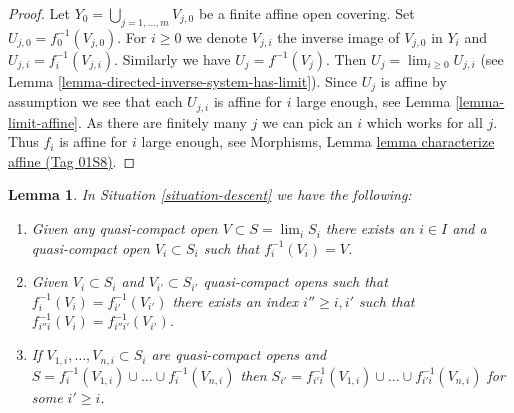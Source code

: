 \documentclass{amsart}
\theoremstyle{plain}
\newtheorem{lemma}[subsection]{Lemma}
\theoremstyle{definition}
\theoremstyle{remark}
\numberwithin{equation}{subsection}
\def\lim{\mathop{\mathrm{lim}}\nolimits}
\begin{document}
\begin{proof}
Let $Y_0 = \bigcup_{j = 1, \ldots, m} V_{j, 0}$ be a finite affine
open covering. Set $U_{j, 0} = f_0^{-1}(V_{j, 0})$. For $i \geq 0$
we denote $V_{j, i}$ the inverse image of $V_{j, 0}$ in $Y_i$ and
$U_{j, i} = f_i^{-1}(V_{j, i})$. Similarly we have
$U_j = f^{-1}(V_j)$. Then $U_j = \lim_{i \geq 0} U_{j, i}$
(see Lemma \ref{lemma-directed-inverse-system-has-limit}).
Since $U_j$ is affine by assumption we see that
each $U_{j, i}$ is affine for $i$ large enough, see
Lemma \ref{lemma-limit-affine}. As there are finitely many $j$ we
can pick an $i$ which works for all $j$. Thus $f_i$ is
affine for $i$ large enough, see
Morphisms, Lemma \href{https://stacks.math.columbia.edu/tag/01S8}{lemma characterize affine (Tag 01S8)}.
\end{proof}


\begin{lemma}
\label{lemma-descend-opens}
In Situation \ref{situation-descent} we have the following:
\begin{enumerate}
\item Given any quasi-compact open $V \subset S = \lim_i S_i$
there exists an $i \in I$ and a quasi-compact open $V_i \subset S_i$
such that $f_i^{-1}(V_i) = V$.
\item Given $V_i \subset S_i$ and $V_{i'} \subset S_{i'}$
quasi-compact opens such that $f_i^{-1}(V_i) = f_{i'}^{-1}(V_{i'})$
there exists an index $i'' \geq i, i'$ such that
$f_{i''i}^{-1}(V_i) = f_{i''i'}^{-1}(V_{i'})$.
\item If $V_{1, i}, \ldots, V_{n, i} \subset S_i$ are quasi-compact
opens and $S = f_i^{-1}(V_{1, i}) \cup \ldots \cup f_i^{-1}(V_{n, i})$
then $S_{i'} = f_{i'i}^{-1}(V_{1, i}) \cup \ldots \cup f_{i'i}^{-1}(V_{n, i})$
for some $i' \geq i$.
\end{enumerate}
\end{lemma}
\end{document}
